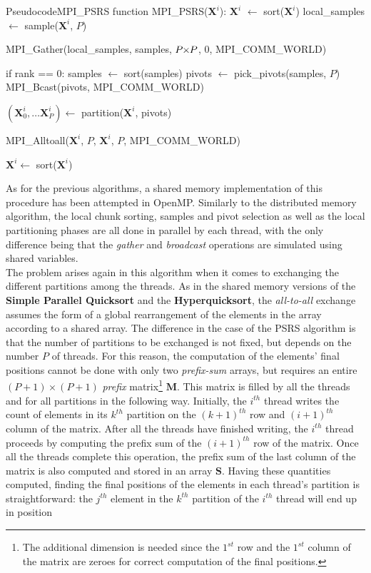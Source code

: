 \documentclass[../main.tex]{subfiles}
\begin{document}
\begin{codeblock}
\begin{code}{Pseudocode}{MPI\_PSRS}
function MPI_PSRS($\mathbf{X}^i$):
    $\mathbf{X}^i$ $\leftarrow$ sort($\mathbf{X}^i$)
    local_samples $\leftarrow$ sample($\mathbf{X}^i$, $P$)

    MPI_Gather(local_samples, samples, $P \hspace{-1mm}\times \hspace{-1mm} P$, 0, MPI_COMM_WORLD)

    if rank == 0:
        samples $\leftarrow$ sort(samples)
        pivots $\leftarrow$ pick_pivots(samples, $P$)
        MPI_Bcast(pivots, MPI_COMM_WORLD)
    
    $ (\mathbf{X}^{i}_{0},\dots \mathbf{X}^{i}_{P}) \leftarrow$ partition($\mathbf{X}^i$, pivots)

    MPI_Alltoall($\mathbf{X}^i$, $P$, $\mathbf{X}^i$, $P$, MPI_COMM_WORLD)

    $\mathbf{X}^i \leftarrow$ sort($\mathbf{X}^i$)
\end{code}
\caption{Pseudocode for the MPI implementation of the PSRS algorithm.}
\label{code:mpi_psrs}
\end{codeblock}
As for the previous algorithms, a shared memory implementation of this 
procedure has been attempted in OpenMP. Similarly to the distributed
memory algorithm, the local chunk sorting, samples and pivot selection 
as well as the local partitioning phases are all done in parallel by each thread, with the only difference being that the \textit{gather} and \textit{broadcast} operations are simulated using shared variables.\\
The problem arises again in this algorithm when it comes to exchanging the
different partitions among the threads. As in the shared memory versions of the \textbf{Simple Parallel Quicksort} and the \textbf{Hyperquicksort}, the \textit{all-to-all} exchange assumes the form of a global rearrangement of the elements in the array according to a shared  array. The difference in the case of the PSRS algorithm is that the number of partitions to be exchanged is not fixed, but depends on the number $P$ of threads. For this reason, the computation of the elements' final positions cannot be done with only two \textit{prefix-sum} arrays, but requires an entire $(P+1) \times (P+1)$ \textit{prefix} matrix\footnote{The additional dimension is needed since the $1^{st}$ row and the $1^{st}$ column of the matrix are zeroes for correct computation of the final positions.} $\mathbf{M}$. This matrix is filled by all the threads and for all partitions in the following way. Initially, the $i^{th}$ thread writes the count of elements in its $k^{th}$ partition on the ${(k+1)}^{th}$ row and ${(i+1)}^{th}$ column of the matrix. After all the threads have finished writing, the $i^{th}$ thread proceeds by computing the prefix sum of the ${(i+1)}^{th}$ row of the matrix. Once all the threads complete this operation, the prefix sum of the last column of the matrix is also computed and stored in an array $\mathbf{S}$. Having these quantities computed, finding the final positions of the elements in each thread's partition is straightforward: the $j^{th}$ element in the $k^{th}$ partition of the $i^{th}$ thread will end up in position
\end{document}
